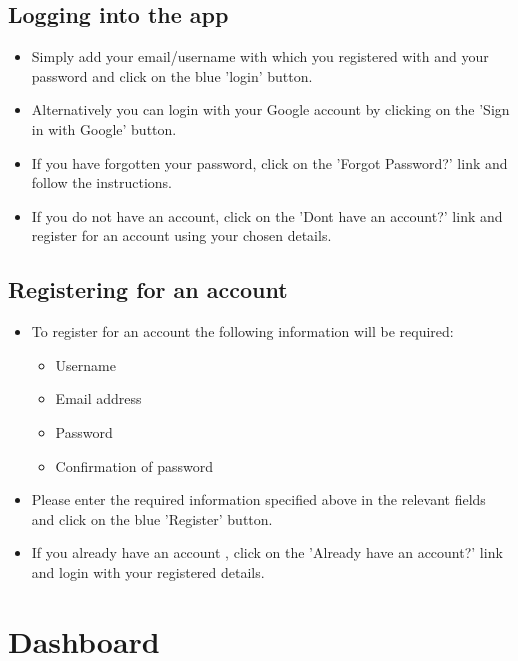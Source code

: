 \documentclass[12pt]{article}
\begin{document}
\subsection{Logging into the app}
\begin{itemize}
    \item Simply add your email/username with which you registered with and your password and click on the blue 'login' button.
    \item Alternatively you can login with your Google account by clicking on the 'Sign in with Google' button.
    \item If you have forgotten your password, click on the 'Forgot Password?' link and follow the instructions.
    \item If you do not have an account, click on the 'Dont have an account?' link and register for an account using your chosen details.
\end{itemize}
\subsection{Registering for an account}
\begin{itemize}
    \item To register for an account the following information will be required:
    \begin{itemize}
        \item Username
        \item Email address
        \item Password
        \item Confirmation of password
    \end{itemize}
    \item Please enter the required information specified above in the relevant fields and click on the blue 'Register' button.
    \item If you already have an account , click on the 'Already have an account?' link and login with your registered details.
\end{itemize}
\newpage
\section{Dashboard}
\end{document}
